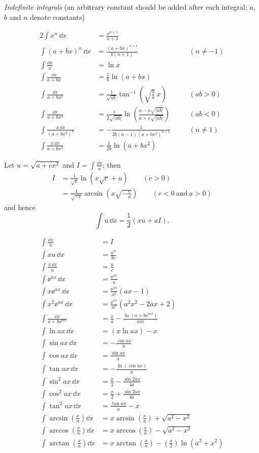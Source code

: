 \textit{Indefinite integrals} \quad (an arbitrary constant should be added after each integral; $a$, $b$ and $n$ denote constants)

\begin{alignat*}{2}
\int x^n\,\dd x &= \frac{x^{n+1}}{n+1} &&\\
\int (a+bx)^n\,\dd x &= \frac{(a+bx)^{n+1}}{b(n+1)} &&\quad (n\neq-1)\\
\int\frac{\dd x}{x} &= \ln x &&\\
\int\frac{\dd x}{a+bx} &= \frac1b\ln(a+bx) &&\\
\int\frac{\dd x}{a+bx^2} &= \frac{1}{\sqrt{ab}}\tan^{-1}\left(\sqrt{\frac ba}\,x\right) &&\quad (ab>0)\\
\int\frac{\dd x}{a+bx^2} &= \frac{1}{2\sqrt{|ab|}}\ln\left(\frac{a-x\sqrt{|ab|}}{a+x\sqrt{|ab|}}\right) &&\quad (ab<0)\\
\int\frac{x\,\dd x}{(a+bx^2)^n} &= -\frac{1}{2b(n-1)(a+bx^2)^{n-1}} &&\quad (n\neq1)\\
\int\frac{x\,\dd x}{a+bx^2} &= \frac{1}{2b}\ln(a+bx^2) &&
\end{alignat*}

Let $u=\sqrt{a+cx^2}$ and $I=\displaystyle\int\frac{\dd x}{u}$; then
\begin{align*}
I &= \frac{1}{\sqrt c}\ln(x\sqrt c+u) \qquad (c>0)\\
&= \frac{1}{\sqrt{-c}}\arcsin\left(x\sqrt{-\frac ca}\right) \qquad (c<0\ \text{and}\ a>0)
\end{align*}
and hence
\[
\int u\,\dd x=\frac12(xu+aI).
\]

\begin{align*}
\int\frac{\dd x}{u} &= I\\
\int x u\,\dd x &= \frac{u^3}{3c}\\
\int\frac{x\,\dd x}{u} &= \frac{u}{c}\\
\int \ee^{ax}\,\dd x &= \frac{\ee^{ax}}{a}\\
\int x \ee^{ax}\,\dd x &= \frac{\ee^{ax}}{a^2}(ax-1)\\
\int x^2 \ee^{ax}\,\dd x &= \frac{\ee^{ax}}{a^3}(a^2x^2-2ax+2)\\
\int\frac{\dd x}{a+b\ee^{mx}} &= \frac{x}{a}-\frac{\ln(a+b\ee^{mx})}{am}\\
\int\ln ax\,\dd x &= (x\ln ax)-x\\
\int\sin ax\,\dd x &= -\frac{\cos ax}{a}\\
\int\cos ax\,\dd x &= \frac{\sin ax}{a}\\
\int\tan ax\,\dd x &= -\frac{\ln(\cos ax)}{a}\\
\int\sin^2 ax\,\dd x &= \frac{x}{2}-\frac{\sin 2ax}{4a}\\
\int\cos^2 ax\,\dd x &= \frac{x}{2}+\frac{\sin 2ax}{4a}\\
\int\tan^2 ax\,\dd x &= \frac{\tan ax}{a}-x\\
\int\arcsin\left(\frac xa\right)\dd x &= x\arcsin\left(\frac xa\right)+\sqrt{a^2-x^2}\\
\int\arccos\left(\frac xa\right)\dd x &= x\arccos\left(\frac xa\right)-\sqrt{a^2-x^2}\\
\int\arctan\left(\frac xa\right)\dd x &= x\arctan\left(\frac xa\right)-\left(\frac a2\right)\ln(a^2+x^2)
\end{align*}

